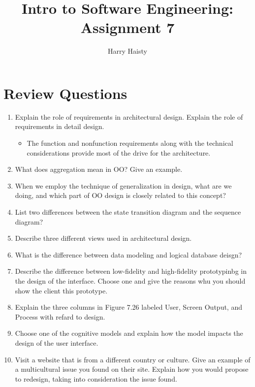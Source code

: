 \documentclass[11pt]{article}
\title{Intro to Software Engineering: Assignment 7}
\author{Harry Haisty}
\begin{document}
    \maketitle
    \section*{Review Questions}
    \begin{enumerate}
    
    \item Explain the role of requirements in architectural design. Explain the role of requirements in detail design. 
    \begin{itemize}
        \item The function and nonfunction requirements along with the technical considerations provide most of the drive for the architecture. 
    \end{itemize}

    \item What does aggregation mean in OO? Give an example.

    \item When we employ the technique of generalization in design, what are we doing, and which part of OO design is closely related to this concept?

    \item List two differences between the state transition diagram and the sequence diagram?

    \item Describe three different views used in architectural design. 

    \item What is the difference between data modeling and logical database deisgn?

    \item Describe the difference between low-fidelity and high-fidelity prototypinbg in the design of the interface. Choose one and give the reasons whu you should show the client this prototype. 

    \item Explain the three columns in Figure 7.26 labeled User, Screen Output, and Process with refard to design. 

    \item Choose one of the cognitive models and explain how the model impacts the design of the user interface. 

    \item Visit a website that is from a different country or culture. Give an example of a multicultural 
    issue you found on their site. Explain how you would propose to redesign, taking into consideration the issue found. 
    
    \end{enumerate}
    
    
\end{document}
